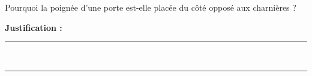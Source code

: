 Pourquoi la poignée d'une porte est-elle placée du côté opposé aux charnières ?

\choices

\noindent\textbf{Justification :} \hrulefill \\[2.5ex]
\rule{\linewidth}{0.4pt} \\[2.5ex]
\rule{\linewidth}{0.4pt}
\vfill
